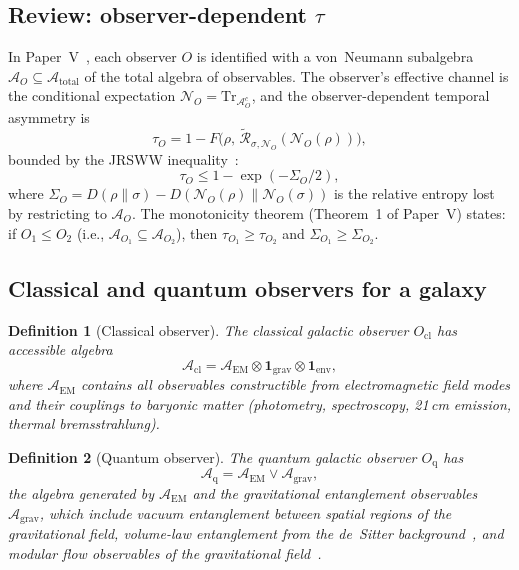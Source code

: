 \documentclass[prd,twocolumn,superscriptaddress,longbibliography,floatfix]{revtex4-2}
\newtheorem{definition}{Definition}
\newcommand{\Tr}{\mathrm{Tr}}
\newcommand{\Petz}{\mathcal{R}}
\newcommand{\chan}{\mathcal{N}}
\newcommand{\KL}{D}
\newcommand{\tauasym}{\tau}
\newcommand{\algO}{\mathcal{A}}
\begin{document}
\subsection{Review: observer-dependent $\tauasym$}

In Paper~V~\cite{Paper5}, each observer $O$ is identified with
a von~Neumann subalgebra $\algO_O \subseteq
\algO_{\mathrm{total}}$ of the total algebra of observables.
The observer's effective channel is the conditional expectation
$\chan_O = \Tr_{\algO_O^c}$, and the observer-dependent
temporal asymmetry is
\begin{equation}
\tauasym_O = 1 - F\!\big(\rho,\,
\tilde{\Petz}_{\sigma,\chan_O}(\chan_O(\rho))\big),
\label{eq:tau_O}
\end{equation}
bounded by the JRSWW inequality~\cite{Junge2018}:
\begin{equation}
\tauasym_O \leq 1 - \exp(-\Sigma_O/2),
\label{eq:tau_bound}
\end{equation}
where $\Sigma_O = \KL(\rho\|\sigma) -
\KL(\chan_O(\rho)\|\chan_O(\sigma))$ is the relative entropy
lost by restricting to $\algO_O$.  The monotonicity theorem
(Theorem~1 of Paper~V) states: if $O_1 \leq O_2$ (i.e.,
$\algO_{O_1} \subseteq \algO_{O_2}$), then
$\tauasym_{O_1} \geq \tauasym_{O_2}$ and
$\Sigma_{O_1} \geq \Sigma_{O_2}$.

\subsection{Classical and quantum observers for a galaxy}

\begin{definition}[Classical observer]
\label{def:classical}
The classical galactic observer $O_{\mathrm{cl}}$ has
accessible algebra
\begin{equation}
\algO_{\mathrm{cl}} = \algO_{\mathrm{EM}} \otimes
\mathbf{1}_{\mathrm{grav}} \otimes \mathbf{1}_{\mathrm{env}},
\end{equation}
where $\algO_{\mathrm{EM}}$ contains all observables
constructible from electromagnetic field modes and their
couplings to baryonic matter (photometry, spectroscopy,
21\,cm emission, thermal bremsstrahlung).
\end{definition}

\begin{definition}[Quantum observer]
\label{def:quantum}
The quantum galactic observer $O_{\mathrm{q}}$ has
\begin{equation}
\algO_{\mathrm{q}} = \algO_{\mathrm{EM}} \vee
\algO_{\mathrm{grav}},
\end{equation}
the algebra generated by $\algO_{\mathrm{EM}}$ and the
gravitational entanglement observables
$\algO_{\mathrm{grav}}$, which include vacuum entanglement
between spatial regions of the gravitational field,
volume-law entanglement from the de~Sitter
background~\cite{Verlinde2016}, and modular flow observables
of the gravitational field~\cite{DorauMuch2025}.
\end{definition}
\end{document}
